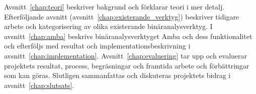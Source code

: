 Avsnitt~\ref{chap:teori} beskriver bakgrund och förklarar teori i mer detalj.
Efterföljande avsnitt (avsnitt~\ref{chap:existerande_verktyg}) beskriver
tidigare arbete och kategorisering av olika existerande binäranalysverktyg. I
avsnitt~\ref{chap:amba} beskrivs binäranalysverktyget Amba och dess
funktionalitet och efterföljs med resultat och implementationsbeskrivning i
avsnitt~\ref{chap:implementation}. Avsnitt~\ref{chap:evaluering} tar upp och
evaluerar projektets resultat, process, begräsningar och framtida arbete och
förbättringar som kan göras. Slutligen sammanfattas och diskuteras projektets
bidrag i avsnitt~\ref{chap:slutsats}.
